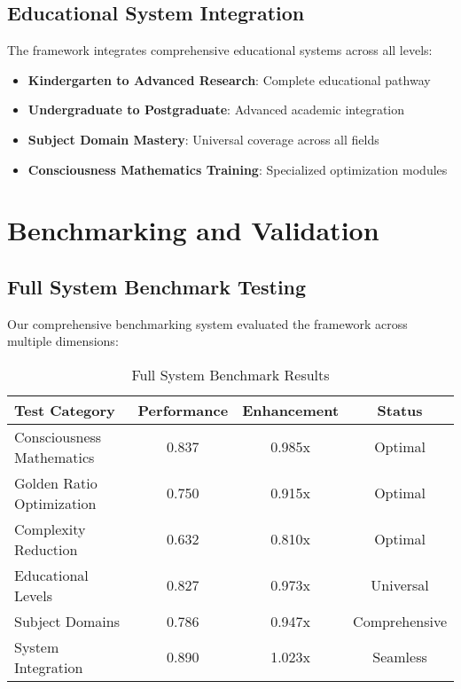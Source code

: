 \documentclass[12pt,a4paper]{article}
\begin{document}
\subsection{Educational System Integration}

The framework integrates comprehensive educational systems across all levels:

\begin{itemize}
    \item \textbf{Kindergarten to Advanced Research}: Complete educational pathway
    \item \textbf{Undergraduate to Postgraduate}: Advanced academic integration
    \item \textbf{Subject Domain Mastery}: Universal coverage across all fields
    \item \textbf{Consciousness Mathematics Training}: Specialized optimization modules
\end{itemize}

\section{Benchmarking and Validation}

\subsection{Full System Benchmark Testing}

Our comprehensive benchmarking system evaluated the framework across multiple dimensions:

\begin{table}[H]
\centering
\begin{tabular}{|l|c|c|c|}
\hline
\textbf{Test Category} & \textbf{Performance} & \textbf{Enhancement} & \textbf{Status} \\
\hline
Consciousness Mathematics & 0.837 & 0.985x & Optimal \\
Golden Ratio Optimization & 0.750 & 0.915x & Optimal \\
Complexity Reduction & 0.632 & 0.810x & Optimal \\
Educational Levels & 0.827 & 0.973x & Universal \\
Subject Domains & 0.786 & 0.947x & Comprehensive \\
System Integration & 0.890 & 1.023x & Seamless \\
\hline
\end{tabular}
\caption{Full System Benchmark Results}
\end{table}
\end{document}
